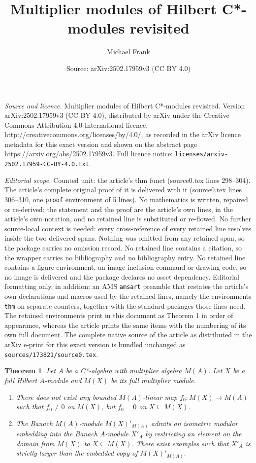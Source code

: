 \documentclass[10pt,a4paper]{amsart}
\title{Multiplier modules of Hilbert C*-modules revisited}
\author{Michael Frank}
\date{Source: arXiv:2502.17959v3 (CC BY 4.0)}
\newtheorem{thm}{Theorem}
\begin{document}
\maketitle

\noindent\emph{Source and licence.} Multiplier modules of Hilbert C*-modules revisited. Version arXiv:2502.17959v3 (CC BY 4.0), distributed by arXiv under the Creative Commons Attribution 4.0 International licence, http://creativecommons.org/licenses/by/4.0/, as recorded in the arXiv licence metadata for this exact version and shown on the abstract page https://arxiv.org/abs/2502.17959v3. Full licence notice: \texttt{licenses/arxiv-2502.17959-CC-BY-4.0.txt}.\par\smallskip

\noindent\textit{Editorial scope.} Counted unit: the article's thm funct (source0.tex lines 298--304). The article's complete original proof of it is delivered with it (source0.tex lines 306--310, one \texttt{proof} environment of 5 lines). No mathematics is written, repaired or re-derived: the statement and the proof are the article's own lines, in the article's own notation, and no retained line is substituted or re-flowed.  No further source-local context is needed: every cross-reference of every retained line resolves inside the two delivered spans.  Nothing was omitted from any retained span, so the package carries no omission record.  No retained line contains a citation, so the wrapper carries no bibliography and no bibliography entry.  No retained line contains a figure environment, an image-inclusion command or drawing code, so no image is delivered and the package declares no asset dependency.  Editorial formatting only, in addition: an AMS \texttt{amsart} preamble that restates the article's own declarations and macros used by the retained lines, namely the environments \texttt{thm} on separate counters, together with the standard packages those lines need.  The retained environments print in this document as Theorem 1 in order of appearance, whereas the article prints the same items with the numbering of its own full document.  The complete native source of the article as distributed in the arXiv e-print for this exact version is bundled unchanged as \texttt{sources/173821/source0.tex}.
\begin{thm} \label{funct}
Let $A$ be a C*-algebra with multiplier algebra $M(A)$. Let $X$ be a full Hilbert $A$-module and $M(X)$ be its full multiplier module.
\begin{enumerate}
  \item There does not exist any bounded $M(A)$-linear map $f_0: M(X) \to M(A)$ such that $f_0 \neq 0$ on $M(X)$, but $f_0 =0$ on $X \subseteq M(X)$.
  \item The Banach $M(A)$-module $M(X)'_{M(A)}$ admits an isometric modular embedding into the Banach $A$-module $X'_A$ by restricting an element on the domain from $M(X)$ to $X\subseteq M(X)$. There exist examples such that $X'_A$ is strictly larger than the embedded copy of $M(X)'_{M(A)}$.
\end{enumerate}
\end{thm}
\end{document}
